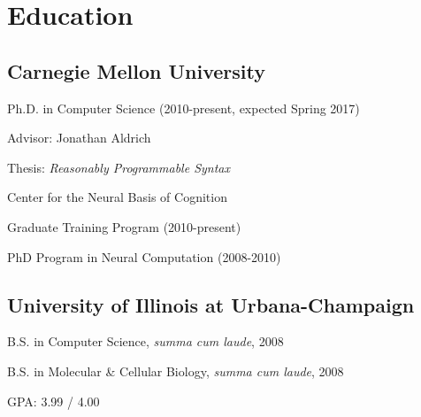 \documentclass[10pt,letterpaper]{article}
\renewenvironment{itemize}{
  \begin{list}{}{
    \setlength{\leftmargin}{1.5em}
    \setlength{\itemsep}{0.25em}
    \setlength{\parskip}{0pt}
    \setlength{\parsep}{0.25em}
  }
}{
  \end{list}
}
\begin{document}
\section*{Education}

\subsection*{Carnegie Mellon University}

\begin{itemize}
  \item Ph.D. in Computer Science (2010-present, expected Spring 2017)
    \begin{itemize}
      \item Advisor: Jonathan Aldrich
      \item Thesis: \emph{Reasonably Programmable Syntax}
    \end{itemize}
  \item Center for the Neural Basis of Cognition
    \begin{itemize}
      \item Graduate Training Program (2010-present)
      \item PhD Program in Neural Computation (2008-2010)
    \end{itemize}
\end{itemize}

\subsection*{University of Illinois at Urbana-Champaign}
\begin{itemize}
  \item B.S. in Computer Science, \textit{summa cum laude}, 2008
  \item B.S. in Molecular \& Cellular Biology, \textit{summa cum laude}, 2008
  \item GPA: 3.99 / 4.00
\end{itemize}
\end{document}

